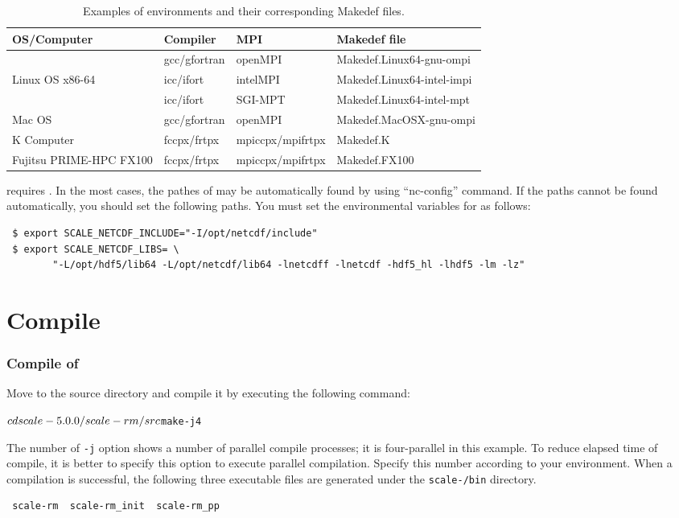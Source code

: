 \begin{table}[htb]
\begin{center}
\caption{Examples of environments and their corresponding Makedef files.}
\begin{tabularx}{150mm}{|l|l|X|l|} \hline
 \rowcolor[gray]{0.9} OS/Computer & Compiler & MPI & Makedef file \\ \hline
                 & gcc/gfortran & openMPI  & Makedef.Linux64-gnu-ompi \\ \cline{2-4}
 Linux OS x86-64 & icc/ifort    & intelMPI & Makedef.Linux64-intel-impi \\ \cline{2-4}
                 & icc/ifort    & SGI-MPT  & Makedef.Linux64-intel-mpt \\ \hline
 Mac OS          & gcc/gfortran & openMPI  & Makedef.MacOSX-gnu-ompi \\ \hline
 K Computer      & fccpx/frtpx  & mpiccpx/mpifrtpx & Makedef.K \\ \hline
 Fujitsu PRIME-HPC FX100 & fccpx/frtpx & mpiccpx/mpifrtpx & Makedef.FX100 \\ \hline
\end{tabularx}
\label{tab:makedef}
\end{center}
\end{table}


\scalelib requires \netcdf.
In the most cases, the pathes of \netcdf may be automatically found by using ``nc-config'' command.
If the paths cannot be found automatically, you should set the following paths.
You must set the environmental variables for \netcdf as follows:
\begin{verbatim}
 $ export SCALE_NETCDF_INCLUDE="-I/opt/netcdf/include"
 $ export SCALE_NETCDF_LIBS= \
        "-L/opt/hdf5/lib64 -L/opt/netcdf/lib64 -lnetcdff -lnetcdf -hdf5_hl -lhdf5 -lm -lz"
\end{verbatim}


\section{Compile} %

\subsubsection{Compile of \scalerm} %

Move to the \scalerm source directory
and compile it by executing the following command:
\begin{alltt}
 $ cd scale-{\version}/scale-rm/src
 $ make -j 4
\end{alltt}
The number of \verb|-j| option shows a number of parallel compile processes;
it is four-parallel in this example.
To reduce elapsed time of compile,
it is better to specify this option to execute parallel compilation.
Specify this number according to your environment.
When a compilation is successful,
the following three executable files are generated under the \texttt{scale-{\version}/bin} directory.
\begin{verbatim}
 scale-rm  scale-rm_init  scale-rm_pp
\end{verbatim}


